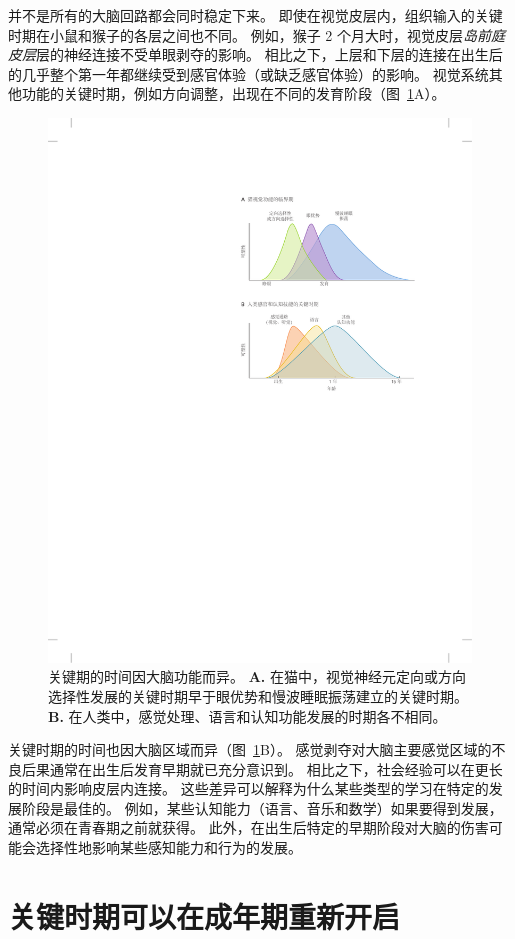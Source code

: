 并不是所有的大脑回路都会同时稳定下来。
即使在视觉皮层内，组织输入的关键时期在小鼠和猴子的各层之间也不同。
例如，猴子 2 个月大时，视觉皮层\textit{岛前庭皮层}层的神经连接不受单眼剥夺的影响。
相比之下，上层和下层的连接在出生后的几乎整个第一年都继续受到感官体验（或缺乏感官体验）的影响。
视觉系统其他功能的关键时期，例如方向调整，出现在不同的发育阶段（图~\ref{fig:49_18}A）。


\begin{figure}[htbp]
	\centering
	\includegraphics[width=0.69\linewidth]{chap49/fig_49_18}
	\caption{关键期的时间因大脑功能而异。
		\textbf{A.} 在猫中，视觉神经元定向或方向选择性发展的关键时期早于眼优势和慢波睡眠振荡建立的关键时期。 \textbf{B.} 在人类中，感觉处理、语言和认知功能发展的时期各不相同。}
	\label{fig:49_18}
\end{figure}


关键时期的时间也因大脑区域而异（图~\ref{fig:49_18}B）。
感觉剥夺对大脑主要感觉区域的不良后果通常在出生后发育早期就已充分意识到。
相比之下，社会经验可以在更长的时间内影响皮层内连接。
这些差异可以解释为什么某些类型的学习在特定的发展阶段是最佳的。
例如，某些认知能力（语言、音乐和数学）如果要得到发展，通常必须在青春期之前就获得。
此外，在出生后特定的早期阶段对大脑的伤害可能会选择性地影响某些感知能力和行为的发展。



\section{关键时期可以在成年期重新开启}

